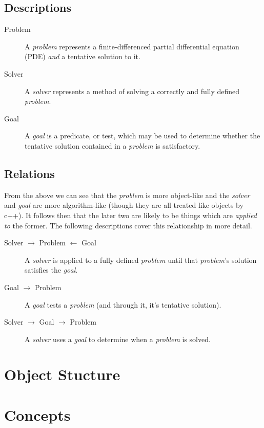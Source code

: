 \documentclass{article}
\begin{document}
\subsection{Descriptions}

\begin{description}
\item[Problem]
A \emph{problem} represents a finite-differenced partial differential
	equation (PDE) \emph{and} a tentative solution to it.
\item[Solver]
A \emph{solver} represents a method of solving a correctly and fully
	defined \emph{problem}.
\item[Goal]
A \emph{goal} is a predicate, or test, which may be used to determine
	whether the tentative solution contained in a \emph{problem} is satisfactory.
\end{description}

\subsection{Relations}
From the above we can see that the \emph{problem} is more object-like and the \emph{solver} and
\emph{goal} are more algorithm-like (though they are all treated like objects by c++). It follows
then that the later two are likely to be things which are \emph{applied to} the former. The following
descriptions cover this relationship in more detail.
\begin{description}
\item[Solver $\rightarrow$ Problem $\leftarrow$ Goal]
A \emph{solver} is applied to a fully defined \emph{problem} until that \emph{problem}'s
  solution satisfies the \emph{goal}.
\item[Goal $\rightarrow$ Problem]
A \emph{goal} tests a \emph{problem} (and through it, it's tentative solution).
\item[Solver $\rightarrow$ Goal $\rightarrow$ Problem]
  A \emph{solver} uses a \emph{goal} to determine when a \emph{problem} is solved.
\end{description}

\section{Object Stucture}

\section{Concepts}
\end{document}
